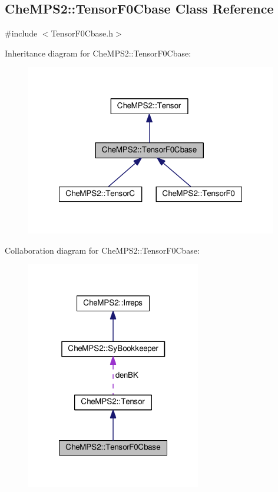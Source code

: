 \hypertarget{classCheMPS2_1_1TensorF0Cbase}{\subsection{Che\-M\-P\-S2\-:\-:Tensor\-F0\-Cbase Class Reference}
\label{classCheMPS2_1_1TensorF0Cbase}
}


{\ttfamily \#include $<$Tensor\-F0\-Cbase.\-h$>$}



Inheritance diagram for Che\-M\-P\-S2\-:\-:Tensor\-F0\-Cbase\-:\nopagebreak
\begin{figure}[H]
\begin{center}
\leavevmode
\includegraphics[width=311pt]{classCheMPS2_1_1TensorF0Cbase__inherit__graph}
\end{center}
\end{figure}


Collaboration diagram for Che\-M\-P\-S2\-:\-:Tensor\-F0\-Cbase\-:\nopagebreak
\begin{figure}[H]
\begin{center}
\leavevmode
\includegraphics[width=216pt]{classCheMPS2_1_1TensorF0Cbase__coll__graph}
\end{center}
\end{figure}

